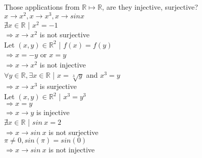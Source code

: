 \documentclass{article}
\begin{document}
\noindent Those applications from $\mathbb{R} \mapsto \mathbb{R}$, are they
injective, surjective?\\

\noindent $x \rightarrow x^2, x \rightarrow x^3, x \rightarrow sin x$\\

\noindent $\nexists x \in \mathbb{R}$ | $x^2 = -1$\\
$\Rightarrow x \rightarrow x^2$ is not surjective\\

\noindent Let $(x, y) \in \mathbb{R}^2$ | $f(x) = f(y)$\\
$\Rightarrow x = -y $ or $ x = y $\\
$\Rightarrow x \rightarrow x^2$ is not injective\\


\noindent $\forall y \in \mathbb{R}, \exists x \in \mathbb{R}
$ | $ x = \sqrt[3]{y}$ and $ x^3 = y$\\
$\Rightarrow x \rightarrow x^3$ is surjective\\

\noindent Let $ (x, y) \in \mathbb{R}^2 $ | $x^3 = y^3$\\
$\Rightarrow x = y$\\
$\Rightarrow x \rightarrow y $ is injective\\

\noindent $\nexists x \in \mathbb{R}$ | $sin \  x = 2$\\
$\Rightarrow x \rightarrow sin \ x $ is not surjective\\

\noindent $ \pi \neq 0, sin(\pi) = sin(0) $ \\
$\Rightarrow x \rightarrow sin \  x $ is not injective\\
\end{document}
